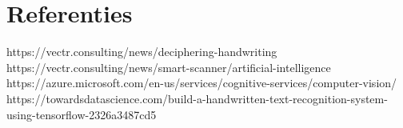 \section{Referenties}
\label{sec:verwachte_conclusies}
https://vectr.consulting/news/deciphering-handwriting
\newline
https://vectr.consulting/news/smart-scanner/artificial-intelligence
\newline
https://azure.microsoft.com/en-us/services/cognitive-services/computer-vision/
\newline
https://towardsdatascience.com/build-a-handwritten-text-recognition-system-using-tensorflow-2326a3487cd5